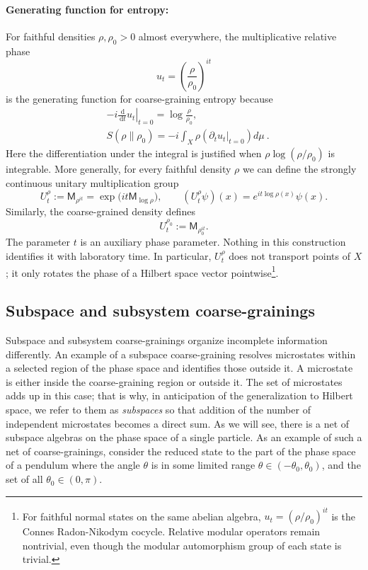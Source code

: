 \documentclass[a4paper,11pt]{article}
\theoremstyle{definition}
\newcommand{\dd}{\,\mathrm{d}}
\newcommand{\Mop}{\mathsf{M}}
\newcommand{\nn}{\nonumber}
\begin{document}
\paragraph{Generating function for entropy:} For faithful densities $\rho,\rho_0>0$ almost everywhere, the multiplicative relative phase
\[
u_t
=
\left(\frac{\rho}{\rho_0}\right)^{it}
\]
is the generating function for coarse-graining entropy because
\begin{align}
&-i\left.\frac{\dd}{\dd t}u_t\right|_{t=0}
=
\log\frac{\rho}{\rho_0},\nn\\
&S(\rho\|\rho_0)=-i \int_X \rho (\partial_t u_t\big|_{t=0})d\mu\ .
\end{align}
Here the differentiation under the integral is justified when $\rho\log(\rho/\rho_0)$ is integrable. More generally, for every faithful density $\rho$ we can define the strongly continuous unitary multiplication group
\[
  U_t^\rho:=\Mop_{\rho^{it}}
  =\exp\!\bigl(it\Mop_{\log\rho}\bigr),
  \qquad
  (U_t^\rho\psi)(x)=e^{it\log\rho(x)}\psi(x).
\]
Similarly, the coarse-grained density defines
\[
  U_t^{\rho_0}:=\Mop_{\rho_0^{it}}.
\]
The parameter $t$ is an auxiliary phase parameter. Nothing in this construction identifies it with laboratory time. In particular, $U_t^\rho$ does not transport points of $X$; it only rotates the phase of a Hilbert space vector pointwise\footnote{For faithful normal states on the same abelian algebra, $u_t=(\rho/\rho_0)^{it}$ is the Connes Radon-Nikodym cocycle. Relative modular operators remain nontrivial, even though the modular automorphism group of each state is trivial.}.

\subsection{Subspace and subsystem coarse-grainings}
\label{subsec:classical-region-subsystem}

Subspace and subsystem coarse-grainings organize incomplete information differently. An example of a subspace coarse-graining resolves microstates within a selected region of the phase space and identifies those outside it. A microstate is either inside the coarse-graining region or outside it. The set of microstates adds up in this case; that is why, in anticipation of the generalization to Hilbert space, we refer to them as {\it subspaces} so that addition of the number of independent microstates becomes a direct sum. As we will see, there is a net of subspace algebras on the phase space of a single particle. As an example of such a net of coarse-grainings, consider the reduced state to the part of the phase space of a pendulum where the angle $\theta$ is in some limited range $\theta\in (-\theta_0,\theta_0)$, and the set of all $\theta_0\in (0,\pi)$.
\end{document}
